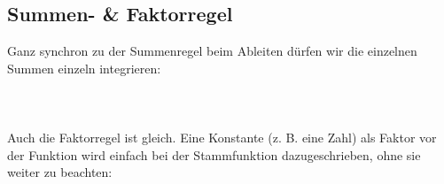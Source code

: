 \subsection{Summen- \& Faktorregel}
	Ganz synchron zu der Summenregel beim Ableiten dürfen wir die einzelnen Summen
	einzeln integrieren:
	\\ \\
	\formel{\[\int (f(x)+g(x))\ dx=\int f(x)\ dx+\int g(x)\ dx\]}
	\\ \\
	Auch die Faktorregel ist gleich. Eine Konstante (z. B. eine Zahl) als Faktor
	vor der Funktion wird einfach bei der Stammfunktion dazugeschrieben, ohne sie
	weiter zu beachten:
	\\ \\
	\formel{\[\int c\cdot f(x)\ dx=c\cdot \int f(x)\ dx\]}
